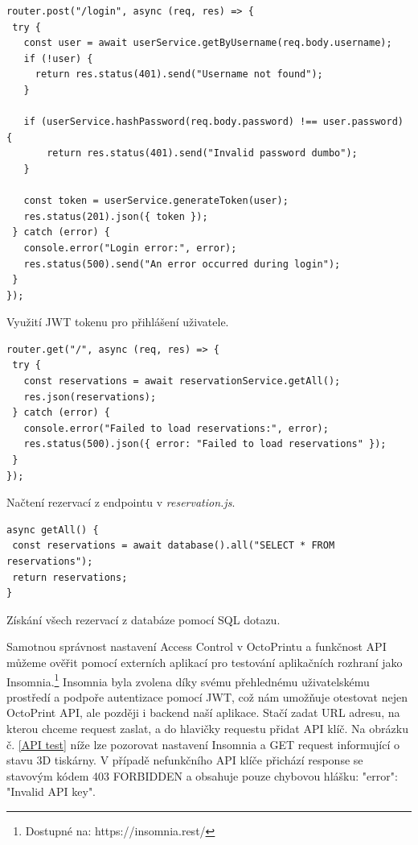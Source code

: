 \documentclass[twoside, 12pt]{article}
\begin{document}
\begin{listing}
\begin{verbatim}
router.post("/login", async (req, res) => {
 try {
   const user = await userService.getByUsername(req.body.username);
   if (!user) {
     return res.status(401).send("Username not found");
   }

   if (userService.hashPassword(req.body.password) !== user.password) {
       return res.status(401).send("Invalid password dumbo");
   }

   const token = userService.generateToken(user);
   res.status(201).json({ token });
 } catch (error) {
   console.error("Login error:", error);
   res.status(500).send("An error occurred during login");
 }
});
\end{verbatim}
\caption{Využití JWT tokenu pro přihlášení uživatele.}
\label{JWT}
\end{listing}

\begin{listing}
\begin{verbatim}
router.get("/", async (req, res) => {
 try {
   const reservations = await reservationService.getAll();
   res.json(reservations);
 } catch (error) {
   console.error("Failed to load reservations:", error);
   res.status(500).json({ error: "Failed to load reservations" });
 }
});
\end{verbatim}
\caption{Načtení rezervací z endpointu v \textit{reservation.js}.}
\label{rezervace}
\end{listing}

\begin{listing}
\begin{verbatim}
async getAll() {
 const reservations = await database().all("SELECT * FROM reservations");
 return reservations;
}
\end{verbatim}
\caption{Získání všech rezervací z databáze pomocí SQL dotazu.}
\label{databaze}
\end{listing}


Samotnou správnost nastavení Access Control v OctoPrintu a funkčnost API můžeme ověřit pomocí externích aplikací pro testování aplikačních rozhraní jako Insomnia.\footnote{Dostupné na: https://insomnia.rest/} Insomnia byla zvolena díky svému přehlednému uživatelskému prostředí a podpoře autentizace pomocí JWT, což nám umožňuje otestovat nejen OctoPrint API, ale později i backend naší aplikace. Stačí zadat URL adresu, na kterou chceme request zaslat, a do hlavičky requestu přidat API klíč. Na obrázku č. \ref{API test} níže lze pozorovat nastavení Insomnia a GET request informující o stavu 3D tiskárny. V případě nefunkčního API klíče přichází response se stavovým kódem 403 FORBIDDEN a obsahuje pouze chybovou hlášku: "error": "Invalid API key".
\end{document}
